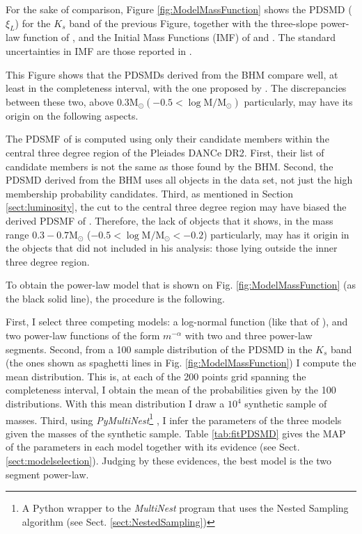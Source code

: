 For the sake of comparison, Figure \ref{fig:ModelMassFunction} shows the PDSMD ($\xi_L$) for the $K_s$ band of the previous Figure, together with the three-slope power-law function of \citet{Bouy2015}, and the Initial Mass Functions (IMF) of \citet{Thies2007} and \citet{Chabrier2005}. The standard uncertainties in \citet{Chabrier2005} IMF are those reported in \citet{Chabrier2003b}. 

This Figure shows that the PDSMDs derived from the BHM compare well, at least in the completeness interval, with the one proposed by \citet{Bouy2015}. The discrepancies between these two, above $0.3 \mathrm{M_{\odot}} (-0.5 < \log \mathrm{M/M_{\odot}})$ particularly, may have its origin on the following aspects.

The PDSMF of \citet{Bouy2015} is computed using only their candidate members within the central three degree region of the Pleiades DANCe DR2. First, their list of candidate members is not the same as those found by the BHM. Second, the PDSMD derived from the BHM uses all objects in the data set, not just the high membership probability candidates. Third, as mentioned in Section \ref{sect:luminosity}, the cut to the central three degree region may have biased the derived PDSMF of \citet{Bouy2015}. Therefore, the lack of objects that it shows,  in the mass range $0.3 - 0.7 \mathrm{M_{\odot}}$ ($-0.5 < \log \mathrm{M/M_{\odot}} < -0.2$) particularly, may has it origin in the objects that \citet{Bouy2015} did not included in his analysis: those lying outside the inner three degree region. 

To obtain the power-law model that is shown on Fig. \ref{fig:ModelMassFunction} (as the black solid line), the procedure is the following. 

First, I select three competing models: a log-normal function (like that of \citet{Chabrier2003b,Chabrier2005}), and two power-law functions of the form $m^{-\alpha}$ with two and three power-law segments. Second, from a 100 sample distribution of the PDSMD in the $K_s$ band (the ones shown as spaghetti lines in Fig. \ref{fig:ModelMassFunction}) I compute the mean distribution. This is, at each of the 200 points grid spanning the completeness interval, I obtain the mean of the probabilities given by the 100 distributions. With this mean distribution I draw a $10^4$ synthetic sample of masses. Third, using \emph{PyMultiNest}\footnote{A Python wrapper to the \emph{MultiNest} program that uses the Nested Sampling algorithm (see Sect. \ref{sect:NestedSampling})} \citep{Buchner2014}, I infer the parameters of the three models given the masses of the synthetic sample. Table \ref{tab:fitPDSMD} gives the MAP of the parameters in each model together with its evidence (see Sect. \ref{sect:modelselection}). Judging by these evidences, the best model is the two segment power-law. 

